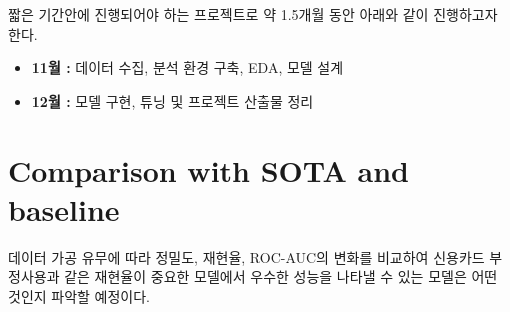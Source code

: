 \documentclass{article}
\begin{document}
짧은 기간안에 진행되어야 하는 프로젝트로 약 1.5개월 동안 아래와 같이 진행하고자 한다.

\begin{itemize}
\item \textbf{11월 : } 데이터 수집, 분석 환경 구축, EDA, 모델 설계
\item \textbf{12월 : } 모델 구현, 튜닝 및 프로젝트 산출물 정리
\end{itemize}

\section{Comparison with SOTA and baseline}
데이터 가공 유무에 따라 정밀도, 재현율, ROC-AUC의 변화를 비교하여 신용카드 부정사용과 같은 재현율이 중요한 모델에서 우수한 성능을 나타낼 수 있는 모델은 어떤 것인지 파악할 예정이다.
\end{document}
